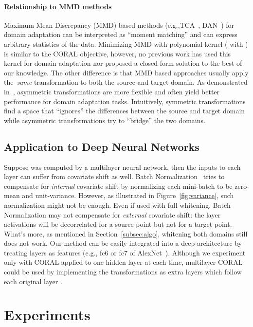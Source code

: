 \documentclass[letterpaper]{article}
\begin{document}
\paragraph{Relationship to MMD methods}
Maximum Mean Discrepancy (MMD) based methods (e.g.,TCA~\cite{tca}, DAN~\cite{dan_long15}) for domain adaptation can be interpreted as ``moment matching'' and can express arbitrary statistics of the data. Minimizing MMD with polynomial kernel ( with ) is similar to the CORAL objective, however, no previous work has used this kernel for domain adaptation nor proposed a closed form solution to the best of our knowledge. 
The other difference is that MMD based approaches usually apply the~\emph{same} transformation to both the source and target domain.  As demonstrated in~\cite{ref:kulis_cvpr11,outlooks,sasb}, asymmetric transformations are more flexible and often yield better performance for domain adaptation tasks. Intuitively, symmetric transformations find a space that ``ignores'' the differences between the source and target domain while asymmetric transformations try to ``bridge'' the two domains.

\subsection{Application to Deep Neural Networks} 
Suppose  was computed by a multilayer neural network, then the inputs to each layer  can suffer from covariate shift as well. Batch Normalization~\cite{batchnorm} tries to compensate for \emph{internal} covariate shift by normalizing each mini-batch to be zero-mean and unit-variance. However, as illustrated in Figure~\ref{fig:variance}, such normalization might not be enough. Even if used with full whitening, Batch Normalization may not compensate for \emph{external} covariate shift: the layer activations will be decorrelated for a source point but not for a target point. What's more, as mentioned in Section~\ref{subsec:algo}, whitening both domains still does not work. Our method can be easily integrated into a deep architecture by treating layers as features (e.g., fc6 or fc7 of AlexNet~\cite{alexnet}). Although we experiment only with CORAL applied to one hidden layer at each time, multilayer CORAL could be used by implementing the transformations  as extra layers which follow each original layer .
\section{Experiments}
\label{sec:exp}
\end{document}
